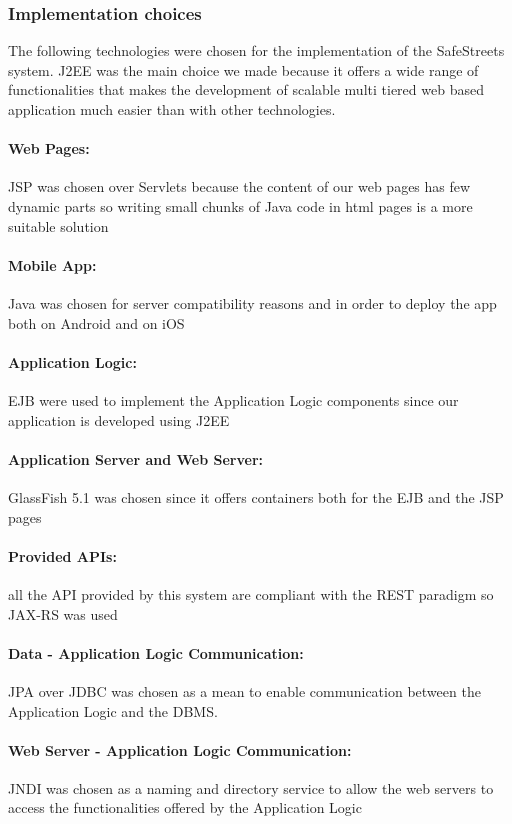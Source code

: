 \label{sec:implementationChoices}
\subsubsection{Implementation choices}
The following technologies were chosen for the implementation of the SafeStreets system. J2EE was the main choice we made because it offers a wide range of functionalities that makes the development of scalable multi tiered web based application much easier than with other technologies.

\paragraph{Web Pages:} JSP was chosen over Servlets because the content of our web pages has few dynamic parts so writing small chunks of Java code in html pages is a more suitable solution
\paragraph{Mobile App:} Java was chosen for server compatibility reasons and in order to deploy the app both on Android and on iOS
\paragraph{Application Logic:} EJB were used to implement the Application Logic components since our application is developed using J2EE
\paragraph{Application Server and Web Server:} GlassFish 5.1 was chosen since it offers containers both for the EJB and the JSP pages 
\paragraph{Provided APIs:} all the API provided by this system are compliant with the REST paradigm so JAX-RS was used
\paragraph{Data - Application Logic Communication:} JPA over JDBC was chosen as a mean to enable communication between the Application Logic and the DBMS.

\paragraph{Web Server - Application Logic Communication:} JNDI was chosen as a naming and directory service to allow the web servers to access the functionalities offered by the Application Logic
